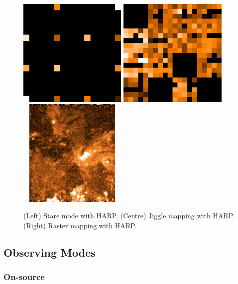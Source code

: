 \documentclass[twoside,11pt]{article}
\newcommand{\xlabel}[1]{}
\renewcommand{\_}{\texttt{\symbol{95}}}
\begin{document}
\begin{figure}[t!]
\begin{center}
\includegraphics[width=5.2cm, height=5.2cm]{sc20_stare}
\includegraphics[width=5.2cm, height=5.2cm]{sc20_jiggle}
\includegraphics[width=5.2cm, height=5.2cm]{sc20_raster}
\caption[Stare, jiggle and raster observing modes]{(Left) Stare mode with HARP. (Centre) Jiggle mapping with HARP. (Right) Raster mapping with HARP.}
\label{fig:harpmodes}
\end{center}
\end{figure}


\subsection{\xlabel{obsmodes}Observing Modes}
\label{sec:obsmodes}

\subsubsection{On-source}
\end{document}
